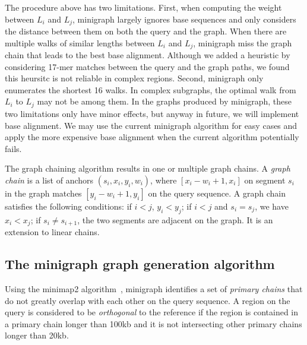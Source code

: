 \documentclass[twocolumn]{bmcart}%
\begin{document}
The procedure above has two limitations. First, when computing the weight
between $L_i$ and $L_j$, minigraph largely ignores base sequences and only considers
the distance between them on both the query and the graph. When there are
multiple walks of similar lengths between $L_i$ and $L_j$, minigraph miss the
graph chain that leads to the best base alignment. Although we added a
heuristic by considering 17-mer matches between the query and the graph paths,
we found this heursitc is not reliable in complex regions. Second, minigraph only
enumerates the shortest 16 walks. In complex subgraphs, the optimal walk from
$L_i$ to $L_j$ may not be among them. In the graphs produced by minigraph,
these two limitations only have minor effects, but anyway in future, we
will implement base alignment. We may use the current minigraph algorithm
for easy cases and apply the more expensive base alignment when the current
algorithm potentially fails.

The graph chaining algorithm results in one or multiple graph chains.  A
\emph{graph chain} is a list of anchors $(s_i,x_i,y_i,w_i)$, where
$[x_i-w_i+1,x_i]$ on segment $s_i$ in the graph matches $[y_i-w_i+1,y_i]$ on
the query sequence. A graph chain satisfies the following conditions: if $i<j$,
$y_i<y_j$; if $i<j$ and $s_i=s_j$, we have $x_i<x_j$; if $s_i\not=s_{i+1}$, the
two segments are adjacent on the graph. It is an extension to linear chains.

\subsection*{The minigraph graph generation algorithm}

Using the minimap2 algorithm~\cite{Li:2018ab}, minigraph identifies a set of
\emph{primary chains} that do not greatly overlap with each other on the query
sequence. A region on the query is considered to be \emph{orthogonal} to the
reference if the region is contained in a primary chain longer than 100kb and
it is not intersecting other primary chains longer than 20kb.
\end{document}
